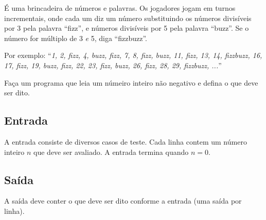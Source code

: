 %

É uma brincadeira de números e palavras. Os jogadores jogam em turnos 
incrementais, onde cada um diz um número substituindo os números divisíveis 
por 3 pela palavra ``fizz'', e números divisíveis por 5 pela palavra 
``buzz''. Se o número for múltiplo de 3 \emph{e} 5, diga ``fizzbuzz''.

Por exemplo:
``\emph{1, 2, fizz, 4, buzz, fizz, 7, 8, fizz, buzz, 11, fizz, 13, 14, fizzbuzz, 16, 17, fizz, 19, buzz, fizz, 22, 23, fizz, buzz, 26, fizz, 28, 29, fizzbuzz,  ...}''

Faça um programa que leia um númeiro inteiro não negativo e defina o que deve ser dito.

\subsection*{Entrada}%
A entrada consiste de diversos casos de teste. Cada linha contem um número inteiro $n$
que deve ser avaliado. A entrada termina quando $n = 0$.

\subsection*{Saída}%
A saída deve conter o que deve ser dito conforme a entrada (uma saída por linha).